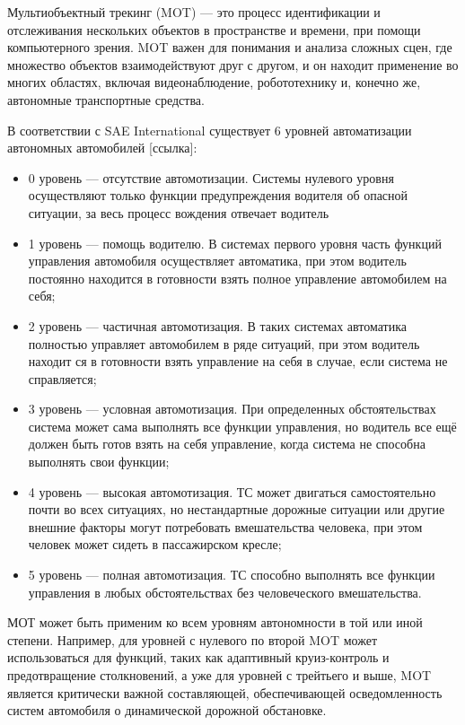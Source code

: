 Мультиобъектный трекинг (MOT) — это процесс идентификации и отслеживания нескольких объектов в пространстве и времени, при помощи компьютерного зрения. MOT важен для понимания и анализа сложных сцен, где множество объектов взаимодействуют друг с другом, и он находит применение во многих областях, включая видеонаблюдение, робототехнику и, конечно же, автономные транспортные средства.

В соответствии с SAE International существует 6 уровней автоматизации автономных автомобилей [ссылка]:

\begin{itemize}

	\item 	0 уровень --- отсутствие автомотизации. Системы нулевого уровня осуществляют только функции предупреждения водителя об опасной ситуации, за весь процесс вождения отвечает водитель

	\item 	1 уровень --- помощь водителю. В системах первого уровня часть функций управления автомобиля осуществляет автоматика, при этом водитель постоянно находится в готовности взять полное управление автомобилем на себя;
	
	\item	2 уровень --- частичная автомотизация. В таких системах автоматика полностью управляет автомобилем в ряде ситуаций, при этом водитель находит ся в готовности взять управление на себя в случае, если система не справляется;
	\item	3 уровень --- условная автомотизация. При определенных обстоятельствах система может сама выполнять все функции управления, но водитель все ещё должен быть готов взять на себя управление, когда система не способна выполнять свои функции;
	\item 	4 уровень --- высокая автомотизация. ТС может двигаться самостоятельно почти во всех ситуациях, но нестандартные дорожные ситуации или другие внешние факторы могут потребовать вмешательства человека, при этом человек может сидеть в пассажирском кресле;
	\item 	5 уровень --- полная автомотизация. ТС способно выполнять все функции управления в любых обстоятельствах без человеческого вмешательства.

\end{itemize}

МОТ может быть применим ко всем уровням автономности в той или иной степени. Например, для уровней с нулевого по второй MOT может использоваться для функций, таких как адаптивный круиз-контроль и предотвращение столкновений, а уже для уровней с трейтьего и выше, MOT является критически важной составляющей, обеспечивающей осведомленность систем автомобиля о динамической дорожной обстановке.


